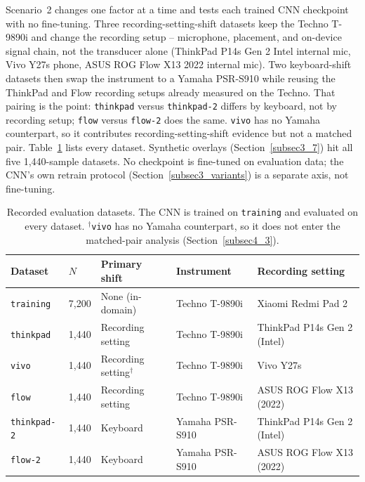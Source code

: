 \documentclass[pdflatex,sn-mathphys-num,iicol]{sn-jnl}
\theoremstyle{thmstyleone}
\theoremstyle{thmstyletwo}
\theoremstyle{thmstylethree}
\begin{document}
Scenario~2 changes one factor at a time and tests each trained CNN checkpoint with no fine-tuning. Three recording-setting-shift datasets keep the Techno T-9890i and change the recording setup -- microphone, placement, and on-device signal chain, not the transducer alone (ThinkPad P14s Gen 2 Intel internal mic, Vivo Y27s phone, ASUS ROG Flow X13 2022 internal mic). Two keyboard-shift datasets then swap the instrument to a Yamaha PSR-S910 while reusing the ThinkPad and Flow recording setups already measured on the Techno. That pairing is the point: \texttt{thinkpad} versus \texttt{thinkpad-2} differs by keyboard, not by recording setup; \texttt{flow} versus \texttt{flow-2} does the same. \texttt{vivo} has no Yamaha counterpart, so it contributes recording-setting-shift evidence but not a matched pair. Table~\ref{tab:scenarios} lists every dataset. Synthetic overlays (Section~\ref{subsec3_7}) hit all five 1{,}440-sample datasets. No checkpoint is fine-tuned on evaluation data; the CNN's own retrain protocol (Section~\ref{subsec3_variants}) is a separate axis, not fine-tuning.

\begin{table}[t]
\caption{Recorded evaluation datasets. The CNN is trained on \texttt{training} and evaluated on every dataset. $^\dagger$\texttt{vivo} has no Yamaha counterpart, so it does not enter the matched-pair analysis (Section~\ref{subsec4_3}).}\label{tab:scenarios}
\begin{tabular*}{\textwidth}{@{\extracolsep{\fill}}lllll@{}}
\toprule
Dataset & $N$ & Primary shift & Instrument & Recording setting \\
\midrule
\texttt{training} & 7{,}200 & None (in-domain) & Techno T-9890i & Xiaomi Redmi Pad 2 \\
\texttt{thinkpad} & 1{,}440 & Recording setting & Techno T-9890i & ThinkPad P14s Gen 2 (Intel) \\
\texttt{vivo} & 1{,}440 & Recording setting$^\dagger$ & Techno T-9890i & Vivo Y27s \\
\texttt{flow} & 1{,}440 & Recording setting & Techno T-9890i & ASUS ROG Flow X13 (2022) \\
\texttt{thinkpad-2} & 1{,}440 & Keyboard & Yamaha PSR-S910 & ThinkPad P14s Gen 2 (Intel) \\
\texttt{flow-2} & 1{,}440 & Keyboard & Yamaha PSR-S910 & ASUS ROG Flow X13 (2022) \\
\bottomrule
\end{tabular*}
\end{table}
\end{document}
